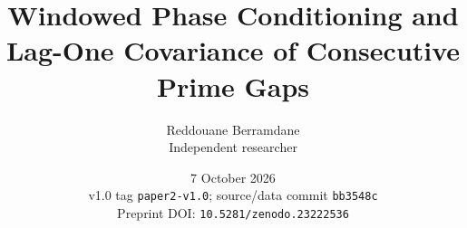 \documentclass[11pt, a4paper]{article}
\title{Windowed Phase Conditioning and Lag-One Covariance of Consecutive Prime Gaps}
\author{Reddouane Berramdane\\ \small Independent researcher}
\date{7 October 2026 \\ \small v1.0 tag \texttt{paper2-v1.0}; source/data commit \texttt{bb3548c} \\ \small Preprint DOI: \texttt{10.5281/zenodo.23222536}}
\begin{document}
\maketitle

\begin{abstract}

\end{abstract}














\end{document}
